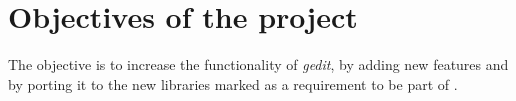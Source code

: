
\chapter{Objectives of the project}

The objective is to increase the functionality of \emph{gedit}, by adding new features and by porting it to the new libraries marked as a requirement to be part of .



